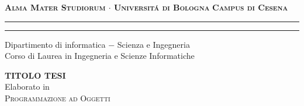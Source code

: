 \begin{titlepage}
    \begin{center}
        {\Large
            \textbf{
                \textsc{Alma Mater Studiorum $\cdot$ Universit\'a di Bologna}
            }
        }
        {\large
            \textbf{
                \textsc{Campus di Cesena}
            }
        }
        \rule[0.1cm]{15.8cm}{0.1mm}
        \rule[0.5cm]{15.8cm}{0.6mm}
        {\Large
                Dipartimento di informatica $-$ Scienza e Ingegneria \\
        }
        \vspace*{4mm}
        {\Large 
            Corso di Laurea in Ingegneria e Scienze Informatiche
        }
        \vspace*{15mm}
        \begin{center}
            {\LARGE
                \textbf{
                    TITOLO TESI
                }
            } \\
            \vspace*{15mm}
            {\Large
                Elaborato in 
            } \\
            \vspace*{3mm}
            {\Large
                \textsc{Programmazione ad Oggetti}
            }
        \end{center}
        \vspace*{40mm}
    \end{center}
\end{titlepage}